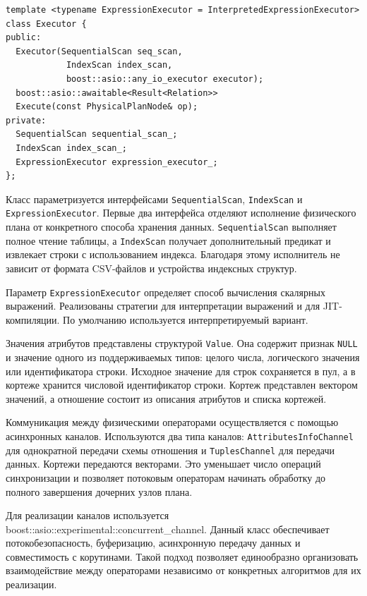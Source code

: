 \documentclass[14pt, russian]{scrartcl}
\begin{document}
\begin{listing}[H]
  \caption{Основные элементы объявления класса Executor.}
  \label{lst:executor}
  \begin{verbatim}
template <typename ExpressionExecutor = InterpretedExpressionExecutor>
class Executor {
public:
  Executor(SequentialScan seq_scan,
            IndexScan index_scan,
            boost::asio::any_io_executor executor);
  boost::asio::awaitable<Result<Relation>>
  Execute(const PhysicalPlanNode& op);
private:
  SequentialScan sequential_scan_;
  IndexScan index_scan_;
  ExpressionExecutor expression_executor_;
};
  \end{verbatim}
\end{listing}

Класс параметризуется интерфейсами \verb|SequentialScan|, \verb|IndexScan| и
\verb|ExpressionExecutor|. Первые два интерфейса отделяют исполнение физического
плана от конкретного способа хранения данных. \verb|SequentialScan| выполняет
полное чтение таблицы, а \verb|IndexScan| получает дополнительный предикат и
извлекает строки с использованием индекса. Благодаря этому исполнитель не
зависит от формата CSV-файлов и устройства индексных структур.

Параметр \verb|ExpressionExecutor| определяет способ вычисления скалярных
выражений. Реализованы стратегии для интерпретации выражений и для
JIT-компиляции. По умолчанию используется интерпретируемый вариант.

Значения атрибутов представлены структурой \verb|Value|. Она содержит признак
\verb|NULL| и значение одного из поддерживаемых типов: целого числа, логического
значения или идентификатора строки. Исходное значение для строк сохраняется в
пул, а в кортеже хранится числовой идентификатор строки. Кортеж представлен
вектором значений, а отношение состоит из описания атрибутов и списка кортежей.

Коммуникация между физическими операторами осуществляется с помощью асинхронных
каналов. Используются два типа каналов: \verb|AttributesInfoChannel| для
однократной передачи схемы отношения и \verb|TuplesChannel| для передачи данных.
Кортежи передаются векторами. Это уменьшает число операций синхронизации и
позволяет потоковым операторам начинать обработку до полного завершения дочерних
узлов плана.

Для реализации каналов используется
boost::asio::experimental::concurrent\_\-channel. Данный класс обеспечивает
потокобезопасность, буферизацию, асинхронную передачу данных и совместимость с
корутинами. Такой подход позволяет единообразно организовать взаимодействие
между операторами независимо от конкретных алгоритмов для их реализации.
\end{document}
